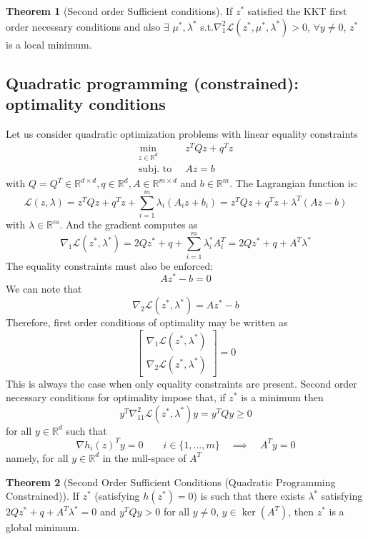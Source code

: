 \documentclass[openany]{book}
\newcommand{\R}{\mathbb{R}}                %
\theoremstyle{definition}
\newtheorem{theorem}{Theorem}[section]
\theoremstyle{remark}
\begin{document}
\begin{theorem}[Second order Sufficient conditions]
If $z^*$ satisfied the KKT first order necessary conditions and also $\exists$ $\mu^*,\lambda^*$ s.t.$\nabla_1^2\mathcal{L}(z^*,\mu^*,\lambda^*) > 0$, $\forall y\not=0$, $z^*$ is a local minimum.
\end{theorem}

\subsection{Quadratic programming (constrained): optimality conditions}

Let us consider quadratic optimization problems with linear equality constraints 
\begin{align*}
    \min_{z\in\R^d}\ & z^TQz+q^Tz \\
    \text{subj. to }\ & Az=b
\end{align*}
with $Q=Q^T\in\R^{d\times d}, q\in\R^d, A\in\R^{m\times d}$ and $b\in\R^m$.
The Lagrangian function is:
\[
    \mathcal{L}(z,\lambda) = z^TQz + q^Tz +\displaystyle\sum_{i=1}^{m}\lambda_i(A_iz+b_i) =  z^TQz + q^Tz + \lambda^T(Az-b)
\]
with $\lambda\in\R^m$. And the gradient computes as 
\[
    \nabla_1 \mathcal{L}(z^*,\lambda^*) = 2Qz^* + q + \displaystyle\sum_{i=1}^{m}\lambda_i^*A_i^T =  2Qz^* + q + A^T\lambda^*
\]
The equality constraints must also be enforced: 
\[
    Az^*-b = 0
\]
We can note that 
\[
    \nabla_2\mathcal{L}(z^*,\lambda^*) = Az^*-b
\]
Therefore, first order conditions of optimality may be written as 
\[
    \begin{bmatrix}
        \nabla_1\mathcal{L}(z^*,\lambda^*)\\ \nabla_2\mathcal{L}(z^*,\lambda^*)
    \end{bmatrix} = 0
\]
This is always the case when only equality constraints are present. Second order necessary conditions for optimality impose that, if $z^*$ is a minimum then 
\[
    y^T\nabla^2_{11}\mathcal{L}(z^*,\lambda^*)y = y^TQy \geq 0
\]
for all $y\in\R^d$ such that 
\[
    \nabla h_i(z)^T y = 0 \qquad i\in\{1,\dots,m\} \quad \implies \quad A^Ty = 0
\]
namely, for all $y\in\R^d$ in the null-space of $A^T$

\begin{theorem}[Second Order Sufficient Conditions (Quadratic Programming Constrained)]
If $z^*$ (satisfying $h(z^*)=0$) is such that there exists $\lambda^*$ satisfying $2Qz^* + q + A^T\lambda^* = 0$ and $y^T Q y > 0$ for all $y \neq 0$, $y \in \ker(A^T)$, then $z^*$ is a global minimum.
\end{theorem}
\end{document}
